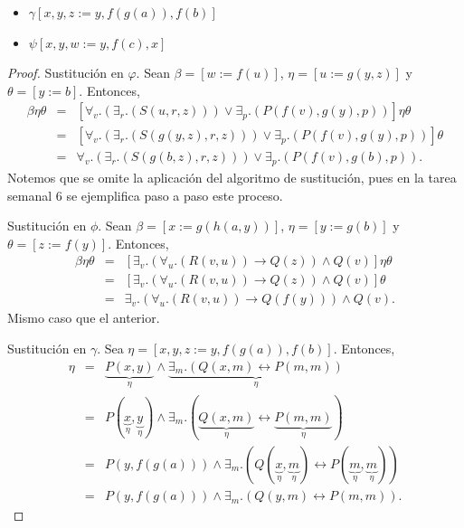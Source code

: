 \documentclass{article}
\begin{document}
\begin{enumerate}
\begin{itemize}
  \item $\gamma[x,y,z := y, f(g(a)), f(b)]$
  \item $\psi[x,y,w := y,f(c),x]$
  \end{itemize}
  \begin{proof}
    Sustitución en $\varphi$. Sean $\beta = [w := f(u)]$, $\eta = [u := g(y,z)]$ y
    $\theta = [y := b]$. Entonces,
    \begin{eqnarray*}
      [\forall_{v}. (\exists_{r}.(S(u,r,z))) \lor \exists_{p}.(P(f(v), g(y), p))] \beta \eta \theta
      &=& [\forall_{v}. (\exists_{r}.(S(u,r,z))) \lor \exists_{p}.(P(f(v), g(y), p))]\eta \theta\\
      &=& [\forall_{v}. (\exists_{r}.(S(g(y,z),r,z))) \lor \exists_{p}.(P(f(v), g(y), p))] \theta\\
      &=& \forall_{v}. (\exists_{r}.(S(g(b,z),r,z))) \lor \exists_{p}.(P(f(v), g(b), p)).
    \end{eqnarray*}
    Notemos que se omite la aplicación del algoritmo de sustitución, pues en la tarea semanal $6$
    se ejemplifica paso a paso este proceso.
    
    Sustitución en $\phi$. Sean $\beta = [x := g(h(a,y))]$, $\eta = [y := g(b)]$ y
    $\theta = [z := f(y)]$. Entonces,
    \begin{eqnarray*}
      [\exists_{v}. (\forall_{u}. (R(v,u)) \rightarrow Q(z)) \land Q(v)]\beta \eta \theta &=&
      [\exists_{v}. (\forall_{u}. (R(v,u)) \rightarrow Q(z)) \land Q(v)]\eta \theta \\
      &=& [\exists_{v}. (\forall_{u}. (R(v,u)) \rightarrow Q(z)) \land Q(v)] \theta\\
      &=& \exists_{v}. (\forall_{u}. (R(v,u)) \rightarrow Q(f(y))) \land Q(v).
    \end{eqnarray*}
    Mismo caso que el anterior.
    
    Sustitución en $\gamma$. Sea $\eta = [x,y,z := y, f(g(a)), f(b)]$. Entonces,
    \begin{eqnarray*}
      [P(x,y) \land \exists_{m}.(Q(x, m) \leftrightarrow P(m,m))] \eta &=&
      \underbrace{P(x,y)}_{\eta} \land \underbrace{\exists_{m}.(Q(x, m) \leftrightarrow P(m,m))}_{\eta}\\
      &=& P(\underbrace{x}_{\eta},\underbrace{y}_{\eta}) \land \exists_{m}.(\underbrace{Q(x, m)}_{\eta} \leftrightarrow \underbrace{P(m,m)}_{\eta})\\
      &=&
      P(y,f(g(a))) \land \exists_{m}.(Q(\underbrace{x}_{\eta}, \underbrace{m}_{\eta}) \leftrightarrow P(\underbrace{m}_{\eta},\underbrace{m}_{\eta}))\\
      &=&  P(y,f(g(a))) \land \exists_{m}.(Q(y, m) \leftrightarrow P(m,m)).
    \end{eqnarray*}
    

\end{proof}
\end{enumerate}
\end{document}
